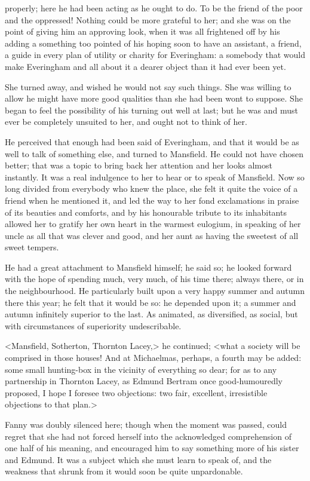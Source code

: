 properly; here he had been acting as he ought to do. To be the friend of the poor and the oppressed! Nothing could be more grateful to her; and she was on the point of giving him an approving look, when it was all frightened off by his adding a something too pointed of his hoping soon to have an assistant, a friend, a guide in every plan of utility or charity for Everingham: a somebody that would make Everingham and all about it a dearer object than it had ever been yet.

She turned away, and wished he would not say such things. She was willing to allow he might have more good qualities than she had been wont to suppose. She began to feel the possibility of his turning out well at last; but he was and must ever be completely unsuited to her, and ought not to think of her.

He perceived that enough had been said of Everingham, and that it would be as well to talk of something else, and turned to Mansfield. He could not have chosen better; that was a topic to bring back her attention and her looks almost instantly. It was a real indulgence to her to hear or to speak of Mansfield. Now so long divided from everybody who knew the place, she felt it quite the voice of a friend when he mentioned it, and led the way to her fond exclamations in praise of its beauties and comforts, and by his honourable tribute to its inhabitants allowed her to gratify her own heart in the warmest eulogium, in speaking of her uncle as all that was clever and good, and her aunt as having the sweetest of all sweet tempers.

He had a great attachment to Mansfield himself; he said so; he looked forward with the hope of spending much, very much, of his time there; always there, or in the neighbourhood. He particularly built upon a very happy summer and autumn there this year; he felt that it would be so: he depended upon it; a summer and autumn infinitely superior to the last. As animated, as diversified, as social, but with circumstances of superiority undescribable.

<Mansfield, Sotherton, Thornton Lacey,> he continued; <what a society will be comprised in those houses! And at Michaelmas, perhaps, a fourth may be added: some small hunting-box in the vicinity of everything so dear; for as to any partnership in Thornton Lacey, as Edmund Bertram once good-humouredly proposed, I hope I foresee two objections: two fair, excellent, irresistible objections to that plan.>

Fanny was doubly silenced here; though when the moment was passed, could regret that she had not forced herself into the acknowledged comprehension of one half of his meaning, and encouraged him to say something more of his sister and Edmund. It was a subject which she must learn to speak of, and the weakness that shrunk from it would soon be quite unpardonable.

